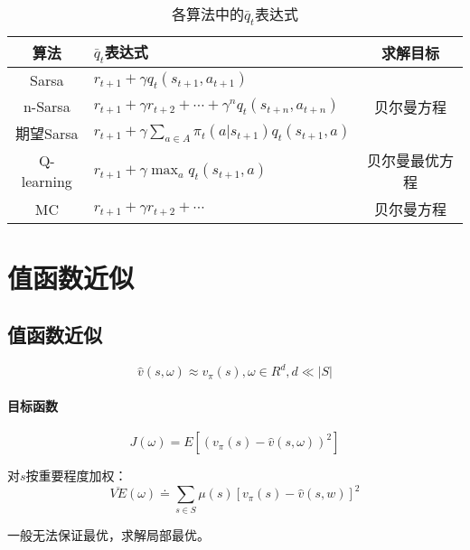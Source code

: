 \documentclass[
12pt, %
a4paper, 
oneside, %
headinclude,footinclude, %
]{scrartcl}
\begin{document}
\begin{table}[H]
\centering
\caption{各算法中的$ \bar{q}_t $表达式}
\begin{tabular}{|c|l|c|}
\hline
算法 & $ \bar{q}_t $表达式 & 求解目标 \\
\hline
Sarsa & $ r_{t + 1} + \gamma q_t(s_{t + 1}, a_{t + 1}) $ & \multirow{3}{*}{贝尔曼方程} \\
\cline{1-2}
n-Sarsa & $ r_{t + 1} + \gamma r_{t + 2} + \cdots + \gamma^n q_t(s_{t + n}, a_{t + n}) $ &  \\
\cline{1-2}
期望Sarsa & $ r_{t + 1} + \gamma \sum_{a \in A} \pi_t(a|s_{t + 1}) q_t(s_{t + 1}, a) $ &  \\
\hline
Q-learning & $ r_{t + 1} + \gamma \max_a q_t(s_{t + 1}, a) $ & 贝尔曼最优方程 \\
\hline
MC & $ r_{t + 1} + \gamma r_{t + 2} + \cdots $ & 贝尔曼方程 \\
\hline
\end{tabular}
\end{table}
\section{值函数近似}
\subsection[值函数近似]{值函数近似}
$$ \hat{v}(s, \omega) \approx v_{\pi}(s), \omega \in R^d, d \ll |S| $$
\paragraph{目标函数}
$$ J(\omega) = E[(v_{\pi}(s) - \hat{v}(s, \omega))^2] $$

对$ s $按重要程度加权：
$$ \overline{VE}(\omega) \doteq \sum_{s \in S} \mu(s) [v_\pi(s) - \hat{v}(s, w)]^2 $$

一般无法保证最优，求解局部最优。
\end{document}
